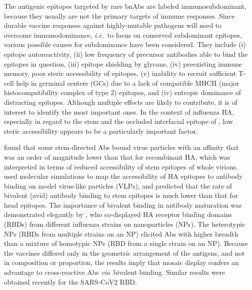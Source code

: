 \documentclass[utf8]{frontiersHLTH}%
\def\ie {{\it i.e.}}
\def\via {{\it via}}
\begin{document}
The antigenic epitopes targeted by rare bnAbs are labeled immunosubdominant, because
they usually are not the primary targets of immune responses.
Since durable vaccine responses against highly-mutable pathogens will need
to overcome immunodominance, \ie~to focus on conserved subdominant epitopes,
various possible causes for subdominance have been considered. They include
(i) epitope autoreactivity,\cite{bajic19a} (ii) low frequency of precursor
antibodies able to bind the epitopes in question,\cite{andrews15} (iii)
epitope shielding by glycans,\cite{bajic19} (iv) preexisting immune
memory,\cite{andrews15,arevalo20} poor steric accessibility of
epitopes\cite{amitai20}, (v) inability to recruit sufficient T-cell help
in germinal centers (GCs) due to a lack of compatible MHCII (major histocompatibility complex of type 2) epitopes,\cite{tan19}
and (iv) entropic dominance of distracting epitopes.\cite{wang17,amitai20,glanville20}
Although multiple effects are likely to contribute, it
is of interest to identify the most important ones. In the
context of influenza HA, especially in regard to the stem and the occluded
interfacial epitope of \citet{watanabe19}, low steric accessibility appears
to be a particularly important factor.

\citet{andrews15} found that some stem-directed Abs bound
virus particles with an affinity that was an order of magnitude lower than that for
recombinant HA, which was interpreted in terms of reduced accessibility of
stem epitopes of whole virions.
\citet{amitai20} used molecular simulations to map the accessibility
of HA epitopes to antibody binding on model virus-like particles (VLPs),
and predicted that the rate of bivalent (avid) antibody binding to stem
epitopes is much lower than that for head epitopes.
The importance of bivalent binding in antibody maturation was
demonstrated elegantly by \citet{kanekiyo19}, who co-displayed HA
receptor binding domains (RBDs) from different influenza strains on
nanoparticles (NPs). The heterotypic NPs (RBDs from multiple strains on an NP)
elicited Abs with higher breadth than a mixture of homotypic NPs (RBD from a single
strain on an NP). Because the vaccines differed only in the geometric
arrangement of the antigens, and not in composition or proportion, the results imply
that mosaic display confers an advantage to cross-reactive Abs
\via~bivalent binding\cite{kanekiyo19}. Similar results were obtained recently for the
SARS-CoV2 RBD.\cite{cohen21}
\end{document}

